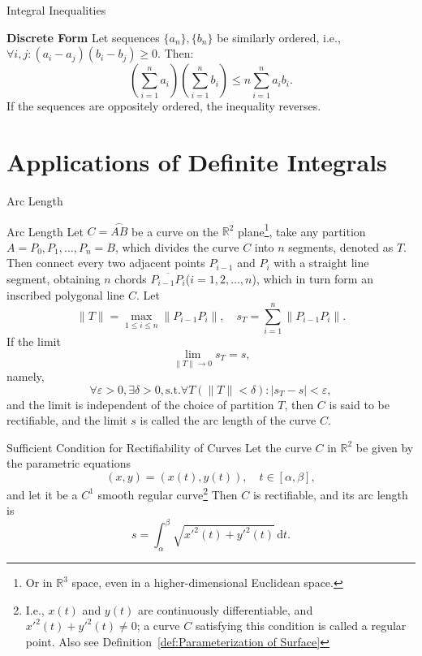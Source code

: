 \documentclass[11pt]{../../TexTemplate/elegantbook}
\begin{document}
\begin{theorem}{Integral Inequalities}
\begin{description}
            \textbf{Discrete Form} Let sequences \( \{a_n\}, \{b_n\} \) be similarly ordered, 
                i.e., \( \forall i, j: (a_i - a_j)(b_i - b_j) \geqslant 0 \). Then:
                \[
                \left( \sum\limits_{i=1}^{n} a_i \right) \left( \sum\limits_{i=1}^{n} b_i \right) \leqslant n \sum\limits_{i=1}^{n} a_i b_i.
                \]
            If the sequences are oppositely ordered, the inequality reverses.
    \end{description}
\end{theorem}

\section{Applications of Definite Integrals}
\begin{leftbarTitle}{Arc Length}\end{leftbarTitle}
\begin{definition}{Arc Length}
    Let \(C = \overset{\frown}{AB}\) be a curve on the \(\mathbb{R}^{2}\) plane\footnote{
        Or in \(\mathbb{R}^{3}\) space, even in a higher-dimensional Euclidean space.
    },
    take any partition \( A = P_{0}, P_{1}, \ldots, P_{n} = B \),
    which divides the curve \(C\) into \(n\) segments, denoted as \(T\).
    Then connect every two adjacent points \(P_{i-1}\) and \(P_{i}\) with a straight line segment,
    obtaining \(n\) chords \(\overline{P_{i-1}P_{i}}\)(\(i=1, 2, \ldots, n\)),
    which in turn form an inscribed polygonal line \(C\).
    Let 
    \[
    \|T\| = \max_{1 \leqslant i \leqslant n} \|P_{i-1}P_{i}\|, \quad s_{T}= \sum_{i=1}^{n} \|P_{i-1}P_{i}\|.
    \]
    If the limit
    \[
    \lim_{\|T\| \to 0} s_{T} = s,
    \] 
    namely, 
    \[
    \forall \varepsilon > 0, \exists \delta > 0, \text{s.t.} \forall T(\|T\| < \delta): |s_{T} - s| < \varepsilon,
    \]
    and the limit is independent of the choice of partition \(T\),
    then \(C\) is said to be rectifiable, and the limit \(s\) is called the arc length of the curve \(C\).
\end{definition}

\begin{theorem}{Sufficient Condition for Rectifiability of Curves}
    Let the curve \(C\) in \(\mathbb{R}^{2}\) be given by the parametric equations 
    \[
    (x, y) = (x(t), y(t)), \quad t \in [\alpha, \beta],
    \] 
    and let it be a \(C^{1}\) smooth regular curve\footnote{
        I.e., \(x(t)\) and \(y(t)\) are continuously differentiable, and \(x'^{2}(t) + y'^{2}(t) \neq 0\); 
        a curve \(C\) satisfying this condition is called a regular point.
        Also see Definition~\ref{def:Parameterization of Surface}
    }
    Then \(C\) is rectifiable, 
    and its arc length is 
    \[
    s = \int_{\alpha}^{\beta} \sqrt{x'^{2}(t) + y'^{2}(t)} \, \mathrm{d}t.
    \]
\end{theorem}
\end{document}
